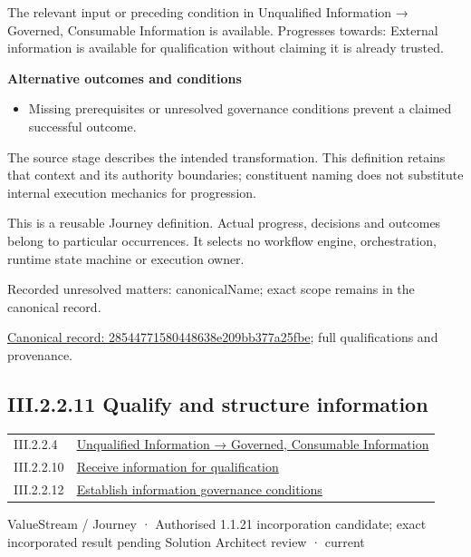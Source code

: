 The relevant input or preceding condition in Unqualified Information → Governed, Consumable Information is available. Progresses towards: External information is available for qualification without claiming it is already trusted.



\par\medskip\textbf{Alternative outcomes and conditions}\par


\begin{itemize}


\item Missing prerequisites or unresolved governance conditions prevent a claimed successful outcome.

\end{itemize}


The source stage describes the intended transformation. This definition retains that context and its authority boundaries; constituent naming does not substitute internal execution mechanics for progression.



This is a reusable Journey definition. Actual progress, decisions and outcomes belong to particular occurrences. It selects no workflow engine, orchestration, runtime state machine or execution owner.


{\small Recorded unresolved matters: canonicalName; exact scope remains in the canonical record.}\par
{\footnotesize \href{../../../../../../../continuum/strategy/value-stream/28544771580448638e209bb377a25fbe.md}{Canonical record: 28544771580448638e209bb377a25fbe}; full qualifications and provenance.}\par
\subsection*{III.2.2.11 Qualify and structure information}
\label{navigation:III.2.2.11}

\begin{longtable}{p{.22\linewidth}p{.73\linewidth}}
III.2.2.4 & \hyperref[element:02e036f18bab400bac261007e39457ee]{Unqualified Information → Governed, Consumable Information} \\
III.2.2.10 & \hyperref[element:28544771580448638e209bb377a25fbe]{Receive information for qualification} \\
III.2.2.12 & \hyperref[element:ae90f7118fe245659f4524fc8991614d]{Establish information governance conditions} \\
\end{longtable}
\label{element:cbedc98406674727a9b1eae8d9bc30da}
{\small ValueStream / Journey · Authorised 1.1.21 incorporation candidate; exact incorporated result pending Solution Architect review · current}\par

